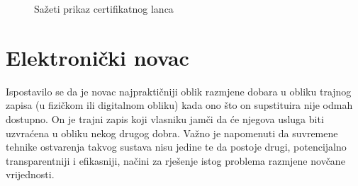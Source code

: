 \documentclass[utf8, zavrsni]{fer}
\begin{document}
\begin{figure}[H]
    \label{chainscheme}
    \caption{Sažeti prikaz certifikatnog lanca}
\end{figure}


\chapter{Elektronički novac}

Ispostavilo se da je novac najpraktičniji oblik razmjene dobara u obliku trajnog zapisa (u fizičkom ili digitalnom obliku) kada ono što on supstituira nije odmah dostupno. On je trajni zapis koji vlasniku jamči da će njegova usluga biti uzvraćena u obliku nekog drugog dobra. Važno je napomenuti da suvremene tehnike ostvarenja takvog sustava nisu jedine te da postoje drugi, potencijalno transparentniji i efikasniji, načini za rješenje istog problema razmjene novčane vrijednosti.
\end{document}
